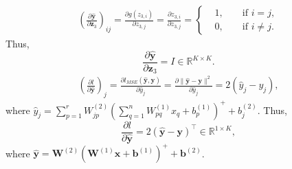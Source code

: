\documentclass[10pt,a4paper]{article}
\theoremstyle{dotlessP}
\def\RR{\mathbb{R}}
\newcommand{\dldy}{\frac{\partial l}{\partial \bm{\hat{y}}}}
\newcommand{\dydz}{\frac{\partial \bm{\hat{y}}}{\partial \bm z_3}}
\newcommand{\yh}{\bm{\hat{y}}}
\begin{document}
\begin{enumerate}[(a)]
\begin{equation}
\begin{aligned}
\left(\dydz\right)_{ij}= \frac{\partial g( z_{3,i} ) }{\partial  z_{3,j}} = \frac{\partial  z_{3,i}  }{\partial z_{3,j}}
=\left\lbrace 
\begin{aligned}
&1, & &\text{ if } i=j,\\
& 0, &  &\text{ if } i\neq j.
\end{aligned}
\right. 
\end{aligned}
\end{equation}
Thus,
\begin{equation}
\dydz = I \in \RR^{K\times K}.
\end{equation}
\begin{equation}
\begin{aligned}
\left(\dldy\right)_j = \frac{\partial l_{MSE}(\yh,\bm y)}{\partial \hat{y}_j}= \frac{\partial \|\yh-\bm y\|^2}{\partial \hat{y}_j} = 2(\hat{y}_j - y_j),
\end{aligned}
\end{equation}
where $\hat{y}_j =\sum_{p=1}^{r}W^{(2)}_{jp} \left( \sum_{q=1}^nW^{(1)}_{pq}x_q+b^{(1)}_p\right)^++b^{(2)}_j$.
Thus, 
\begin{equation}
\dldy = 2(\yh -\bm y)^\top 
\in \RR^{1\times K},
\end{equation}
where $\yh = \bm W^{(2)}\left(\bm W^{(1)} \bm x+\bm b^{(1)}\right)^+ + \bm b^{(2)}$.
\end{enumerate}
\end{document}
